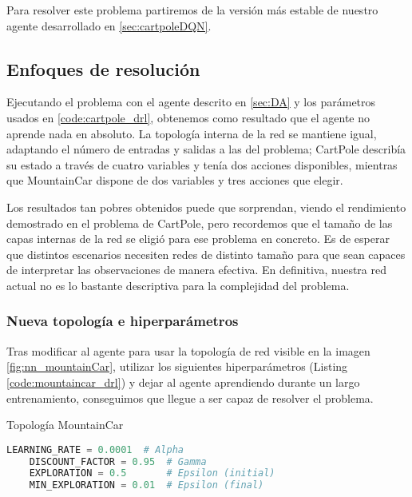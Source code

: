 Para resolver este problema partiremos de la versión más estable de nuestro agente desarrollado en \ref{sec:cartpoleDQN}.


\subsection{Enfoques de resolución}

Ejecutando el problema con el agente descrito en \ref{sec:DA} y los parámetros usados en \ref{code:cartpole_drl}, obtenemos como resultado que el agente no aprende nada en absoluto. La topología interna de la red se mantiene igual, adaptando el número de entradas y salidas a las del problema; CartPole describía su estado a través de cuatro variables y tenía dos acciones disponibles, mientras que MountainCar dispone de dos variables y tres acciones que elegir.

Los resultados tan pobres obtenidos puede que sorprendan, viendo el rendimiento demostrado en el problema de CartPole, pero recordemos que el tamaño de las capas internas de la red se eligió para ese problema en concreto. Es de esperar que distintos escenarios necesiten redes de distinto tamaño para que sean capaces de interpretar las observaciones de manera efectiva. En definitiva, nuestra red actual no es lo bastante descriptiva para la complejidad del problema.


\subsubsection{Nueva topología e hiperparámetros}

Tras modificar al agente para usar la topología de red visible en la imagen \ref{fig:nn_mountainCar}, utilizar los siguientes hiperparámetros  (Listing \ref{code:mountaincar_drl}) y dejar al agente aprendiendo durante un largo entrenamiento, conseguimos que llegue a ser capaz de resolver el problema. 

%
       {Topología MountainCar}

\begin{minipage}{0.9\linewidth}%
    \begin{lstlisting}[frame=tb, language=Python, caption=Hiperparámetros MountainCar, label=code:mountaincar_drl]
    LEARNING_RATE = 0.0001  # Alpha
    DISCOUNT_FACTOR = 0.95  # Gamma
    EXPLORATION = 0.5       # Epsilon (initial)
    MIN_EXPLORATION = 0.01  # Epsilon (final)
    \end{lstlisting}%
\end{minipage}


